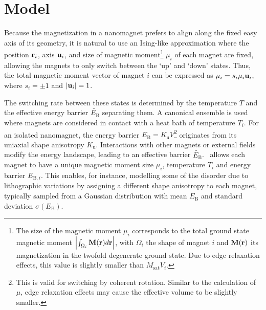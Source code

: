 \section{Model}
Because the magnetization in a nanomagnet prefers to align along the fixed easy axis of its geometry, it is natural to use an Ising-like approximation where the position $\vb{r}_i$, axis $\vb{u}_i$, and size of magnetic moment\footnote{
	The size of the magnetic moment $\mu_i$ corresponds to the total ground state magnetic moment $\abs{\int_{\Omega_i} \vb{M}(\vb{r})d\vb{r}}$, with $\Omega_i$ the shape of magnet $i$ and $\vb{M}(\vb{r})$ its magnetization in the twofold degenerate ground state. Due to edge relaxation effects, this value is slightly smaller than $M_\mathrm{sat} V_i$.
} $\mu_i$ of each magnet are fixed, allowing the magnets to only switch between the `up' and `down' states.
Thus, the total magnetic moment vector of magnet $i$ can be expressed as $\vb{\mu}_i = s_i \mu_i \vb{u}_i$, where $s_i = \pm 1$ and $\abs{\vb{u}_i} = 1$. \par

The switching rate between these states is determined by the temperature $T$ and the effective energy barrier $\widetilde{E_\mathrm{B}}$ separating them.
A canonical ensemble is used where magnets are considered in contact with a heat bath of temperature $T_i$.
For an isolated nanomagnet, the energy barrier $E_\mathrm{B} = K_\mathrm{u} V$\footnote{
	This is valid for switching by coherent rotation. Similar to the calculation of $\mu$, edge relaxation effects may cause the effective volume to be slightly smaller.
} originates from its uniaxial shape anisotropy $K_\mathrm{u}$.
Interactions with other magnets or external fields modify the energy landscape, leading to an effective barrier $\widetilde{E_\mathrm{B}}$.~\cite{leo2021chiral}
\hotspice allows each magnet to have a unique magnetic moment size $\mu_i$, temperature $T_i$ and energy barrier $E_{\mathrm{B},i}$.
This enables, for instance, modelling some of the disorder due to lithographic variations by assigning a different shape anisotropy to each magnet, typically sampled from a Gaussian distribution with mean $E_\mathrm{B}$ and standard deviation $\sigma(E_\mathrm{B})$. \\\par

